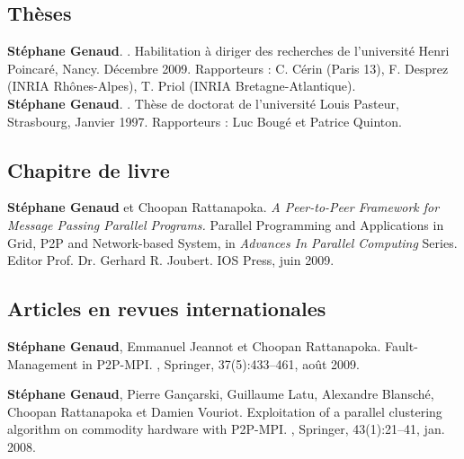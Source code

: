 \documentclass[11pt]{article}
\begin{document}
\small

\begin{thebibliography}{99}

\subsection*{Thèses}

\textbf{Stéphane Genaud}.
.
\newblock Habilitation à diriger des recherches de l'université Henri Poincaré, Nancy. Décembre 2009.
\newblock Rapporteurs : C. Cérin (Paris 13), F. Desprez (INRIA Rhônes-Alpes), T. Priol (INRIA Bretagne-Atlantique).\\[2mm]

\textbf{Stéphane Genaud}.
.
\newblock Thèse de doctorat de l'université Louis Pasteur, Strasbourg, Janvier 1997.
\newblock Rapporteurs : Luc Bougé et Patrice Quinton. 

\subsection*{Chapitre de livre}

\textbf{Stéphane Genaud} et Choopan Rattanapoka.
\newblock \emph{A Peer-to-Peer Framework for Message Passing Parallel Programs.}
\newblock Parallel Programming and Applications in Grid, P2P and Network-based System,
in {\em Advances In Parallel Computing} Series. Editor Prof. Dr. Gerhard R. Joubert.
IOS Press, juin 2009. 
 

\subsection*{Articles en revues internationales}

\setlength{\itemsep}{1.5mm}


\newblock \textbf{Stéphane Genaud}, Emmanuel Jeannot et Choopan Rattanapoka.
\newblock Fault-Management in P2P-MPI.
, Springer, 37(5):433--461, août 2009.


\textbf{Stéphane Genaud}, Pierre Gançarski, Guillaume Latu, Alexandre Blansché, Choopan Rattanapoka et Damien Vouriot.
\newblock Exploitation of a parallel clustering algorithm on commodity hardware with P2P-MPI.
, Springer, 43(1):21--41, jan. 2008.



\end{thebibliography}
\end{document}
